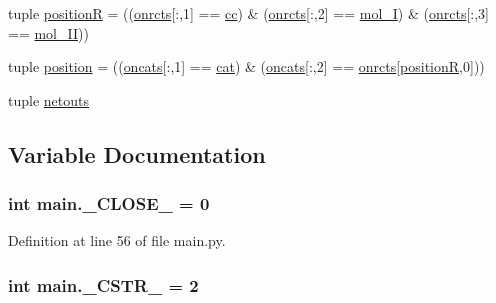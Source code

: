 \begin{DoxyCompactItemize}
\item 
tuple \hyperlink{a00151_adbbdc0f6ad0f08400b3e492f7a807a6b}{position\-R} = ((\hyperlink{a00151_ab26ffc3eda5d201a779d705813b06348}{onrcts}\mbox{[}\-:,1\mbox{]} == \hyperlink{a00028_afb5980388a6e55ca55437b53cdaf528a}{cc}) \& (\hyperlink{a00151_ab26ffc3eda5d201a779d705813b06348}{onrcts}\mbox{[}\-:,2\mbox{]} == \hyperlink{a00028_ab346189eef5359a07ba32144ddcd4465}{mol\-\_\-\-I}) \& (\hyperlink{a00151_ab26ffc3eda5d201a779d705813b06348}{onrcts}\mbox{[}\-:,3\mbox{]} == \hyperlink{a00028_a4d2c086887289f8900b38ffa56854da3}{mol\-\_\-\-I\-I}))
\item 
tuple \hyperlink{a00151_ac67c60df3cc9afae7e4888d2b48b846d}{position} = ((\hyperlink{a00151_ab4d380bc4bfcb970acc39ddf18a73972}{oncats}\mbox{[}\-:,1\mbox{]} == \hyperlink{a00028_a7073f71a43389f3032e69b1fffc2551a}{cat}) \& (\hyperlink{a00151_ab4d380bc4bfcb970acc39ddf18a73972}{oncats}\mbox{[}\-:,2\mbox{]} == \hyperlink{a00151_ab26ffc3eda5d201a779d705813b06348}{onrcts}\mbox{[}\hyperlink{a00151_adbbdc0f6ad0f08400b3e492f7a807a6b}{position\-R},0\mbox{]}))
\item 
tuple \hyperlink{a00151_a02c2194d4e56d3d8c6d2c204a8017e3a}{netouts}
\end{DoxyCompactItemize}


\subsection{Variable Documentation}
\hypertarget{a00151_a05832bb8aa5b5b63ca022653c9b32af5}{
\subsubsection[{\-\_\-\-C\-L\-O\-S\-E\-\_\-}]{\setlength{\rightskip}{0pt plus 5cm}int main.\-\_\-\-C\-L\-O\-S\-E\-\_\- = 0}}\label{a00151_a05832bb8aa5b5b63ca022653c9b32af5}


Definition at line 56 of file main.\-py.

\hypertarget{a00151_a4994448f45a50087ae8864153ab89e10}{
\subsubsection[{\-\_\-\-C\-S\-T\-R\-\_\-}]{\setlength{\rightskip}{0pt plus 5cm}int main.\-\_\-\-C\-S\-T\-R\-\_\- = 2}}\label{a00151_a4994448f45a50087ae8864153ab89e10}


